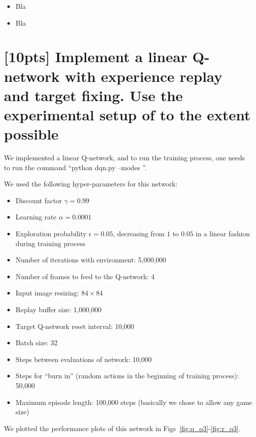 \documentclass{article}
\begin{document}
\begin{itemize}
  \item Bla
  \item Bla
\end{itemize}


\section{[10pts] Implement a linear Q-network with experience replay and target fixing. Use the experimental setup of \cite{mnih2013playing,mnih2015human} to the extent possible}

We implemented a linear Q-network, and to run the training process, one needs to run the command ``python dqn.py --modes ''.

We used the following hyper-parameters for this network:
\begin{itemize}
  \item Discount factor $\gamma=0.99$
  \item Learning rate $\alpha=0.0001$
  \item Exploration probability $\epsilon=0.05$, decreasing from $1$ to $0.05$ in a linear fashion during training process
  \item Number of iterations with environment: 5,000,000
  \item Number of frames to feed to the Q-network: 4
  \item Input image resizing: $84\times84$
  \item Replay buffer size: 1,000,000
  \item Target Q-network reset interval: 10,000
  \item Batch size: 32
  \item Steps between evaluations of network: 10,000
  \item Steps for ``burn in'' (random actions in the beginning of training process): 50,000
  \item Maximum episode length: 100,000 steps (basically we chose to allow any game size)
\end{itemize}

We plotted the performance plots of this network in Figs~\ref{fig:q_q3}-\ref{fig:r_q3}.

\end{document}
